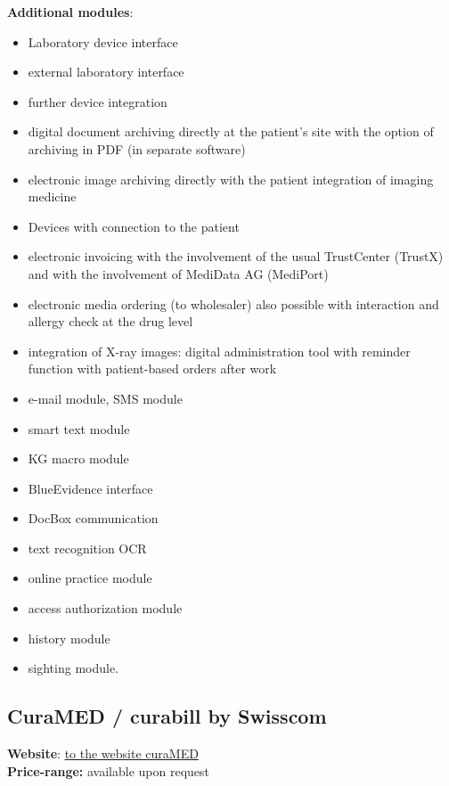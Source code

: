 \documentclass{report}
\begin{document}
\textbf{Additional modules}:
\begin{itemize}
   \item Laboratory device interface
   \item external laboratory interface
   \item further device integration
   \item digital document archiving directly at the patient's site with the option of archiving in PDF (in separate software)
   \item electronic image archiving directly with the patient integration of imaging medicine 
   \item Devices with connection to the patient
   \item electronic invoicing with the involvement of the usual TrustCenter (TrustX) and with the involvement of MediData AG (MediPort)
   \item electronic media ordering (to wholesaler) also possible with interaction and allergy check at the drug level
   \item integration of X-ray images: digital administration tool with reminder function with patient-based orders after work
   \item e-mail module, SMS module
   \item smart text module
   \item KG macro module
   \item BlueEvidence interface
   \item DocBox communication
   \item text recognition OCR
   \item online practice module
   \item access authorization module
   \item history module
   \item sighting module. 
\end{itemize}


\subsection{CuraMED / curabill by Swisscom}
\textbf{Website}: \href{https://www.swisscom.ch/de/business/enterprise/angebot/e-health/curamed.html}{to the website curaMED}\\
\textbf{Price-range:} available upon request\\
\end{document}
